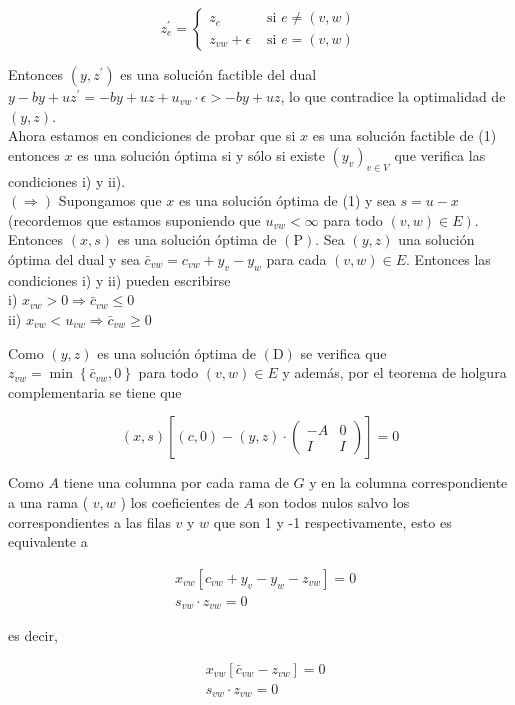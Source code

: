 \documentclass[10pt]{article}
\begin{document}
$$
z_{e}^{\prime}= \begin{cases}z_{e} & \text { si } e \neq(v, w) \\ z_{v w}+\epsilon & \text { si } e=(v, w)\end{cases}
$$

Entonces $\left(y, z^{\prime}\right)$ es una solución factible del dual $y-b y+u z^{\prime}=-b y+u z+u_{v w} \cdot \epsilon>-b y+u z$, lo que contradice la optimalidad de $(y, z)$.\\
Ahora estamos en condiciones de probar que si $x$ es una solución factible de (1) entonces $x$ es una solución óptima si y sólo si existe $\left(y_{v}\right)_{v \in V}$ que verifica las condiciones i) y ii).\\
$(\Longrightarrow)$ Supongamos que $x$ es una solución óptima de (1) y sea $s=u-x$ (recordemos que estamos suponiendo que $u_{v w}<\infty$ para todo $\left.(v, w) \in E\right)$. Entonces $(x, s)$ es una solución óptima de $(\mathrm{P})$. Sea $(y, z)$ una solución óptima del dual y sea $\bar{c}_{v w}=c_{v w}+y_{v}-y_{w}$ para cada $(v, w) \in E$. Entonces las condiciones i) y ii) pueden escribirse\\
i) $x_{v w}>0 \Longrightarrow \bar{c}_{v w} \leq 0$\\
ii) $x_{v w}<u_{v w} \Longrightarrow \bar{c}_{v w} \geq 0$

Como $(y, z)$ es una solución óptima de $(\mathrm{D})$ se verifica que $z_{v w}=\min \left\{\bar{c}_{v w}, 0\right\}$ para todo $(v, w) \in E$ y además, por el teorema de holgura complementaria se tiene que

$$
(x, s)\left[(c, 0)-(y, z) \cdot\left(\begin{array}{cc}
-A & 0 \\
I & I
\end{array}\right)\right]=0
$$

Como $A$ tiene una columna por cada rama de $G$ y en la columna correspondiente a una rama ( $v, w$ ) los coeficientes de $A$ son todos nulos salvo los correspondientes a las filas $v$ y $w$ que son 1 y -1 respectivamente, esto es equivalente a

$$
\begin{aligned}
& x_{v w}\left[c_{v w}+y_{v}-y_{w}-z_{v w}\right]=0 \\
& s_{v w} \cdot z_{v w}=0
\end{aligned}
$$

es decir,

$$
\begin{aligned}
& x_{v w}\left[\bar{c}_{v w}-z_{v w}\right]=0 \\
& s_{v w} \cdot z_{v w}=0
\end{aligned}
$$
\end{document}
